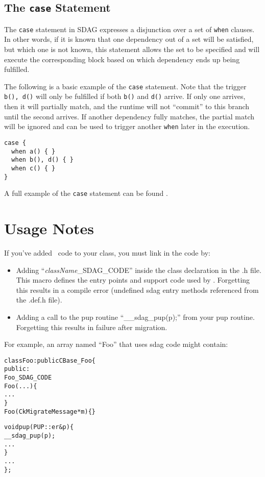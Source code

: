 \subsection{The \texttt{case} Statement}

The \texttt{case} statement in SDAG expresses a disjunction over a set of
\texttt{when} clauses. In other words, if it is known that one dependency out
of a set will be satisfied, but which one is not known, this statement allows
the set to be specified and will execute the corresponding block based on which
dependency ends up being fulfilled.

The following is a basic example of the \texttt{case} statement. Note that the
trigger \texttt{b(), d()} will only be fulfilled if both \texttt{b()} and
\texttt{d()} arrive. If only one arrives, then it will partially match, and the
runtime will not ``commit'' to this branch until the second arrives. If another
dependency fully matches, the partial match will be ignored and can be used to
trigger another \texttt{when} later in the execution.

\begin{verbatim}
case {
  when a() { }
  when b(), d() { }
  when c() { }
}
\end{verbatim}

A full example of the \texttt{case} statement can be found
.

\section{Usage Notes}

If you've added \sdag\ code to your class, you must link in the code by:
\begin{itemize}
  \item Adding ``{\it className}\_SDAG\_CODE'' inside the class declaration
     in the .h file.  This macro defines the entry points and support
     code used by \sdag{}.  Forgetting this results in a compile error
     (undefined sdag entry methods referenced from the .def.h file).
  \item Adding a call to the pup routine ``\_\_sdag\_pup(p);'' from your pup routine.
     Forgetting this results in failure after migration.
\end{itemize}
For example, an array named ``Foo'' that uses sdag code might contain:
\begin{center}
\begin{alltt}
class Foo : public CBase_Foo \{
public:
    Foo_SDAG_CODE
    Foo(...) \{
       ...
    \}
    Foo(CkMigrateMessage *m) \{ \}
    
    void pup(PUP::er &p) \{
       __sdag_pup(p);
       ...
    \}
    . . .
\};
\end{alltt}
\end{center}

